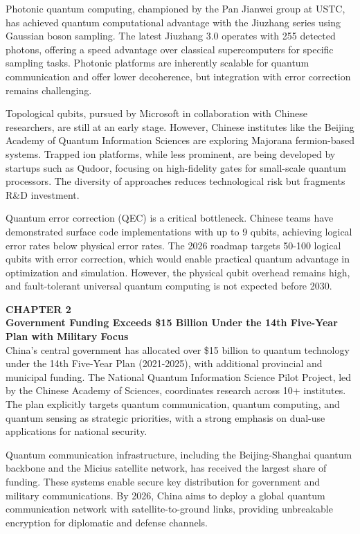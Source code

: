 \documentclass[10pt,a4paper]{article}
\newcommand{\kicker}[1]{\textcolor{BOBlue}{\scriptsize\bfseries\MakeUppercase{#1}}\\[-2pt]}
\newcommand{\Needspace}[1]{\par\vspace{2pt}}
\begin{document}
{\small Photonic quantum computing, championed by the Pan Jianwei group at USTC, has achieved quantum computational advantage with the Jiuzhang series using Gaussian boson sampling. The latest Jiuzhang 3.0 operates with 255 detected photons, offering a speed advantage over classical supercomputers for specific sampling tasks. Photonic platforms are inherently scalable for quantum communication and offer lower decoherence, but integration with error correction remains challenging.}

{\small Topological qubits, pursued by Microsoft in collaboration with Chinese researchers, are still at an early stage. However, Chinese institutes like the Beijing Academy of Quantum Information Sciences are exploring Majorana fermion-based systems. Trapped ion platforms, while less prominent, are being developed by startups such as Qudoor, focusing on high-fidelity gates for small-scale quantum processors. The diversity of approaches reduces technological risk but fragments R\&D investment.}

{\small Quantum error correction (QEC) is a critical bottleneck. Chinese teams have demonstrated surface code implementations with up to 9 qubits, achieving logical error rates below physical error rates. The 2026 roadmap targets 50-100 logical qubits with error correction, which would enable practical quantum advantage in optimization and simulation. However, the physical qubit overhead remains high, and fault-tolerant universal quantum computing is not expected before 2030.}




\Needspace{55mm}
\kicker{Chapter 2}
{\Large\sffamily\bfseries\color{BONavy} Government Funding Exceeds \$15 Billion Under the 14th Five-Year Plan with Military Focus}\\[4pt]

{\small China's central government has allocated over \$15 billion to quantum technology under the 14th Five-Year Plan (2021-2025), with additional provincial and municipal funding. The National Quantum Information Science Pilot Project, led by the Chinese Academy of Sciences, coordinates research across 10+ institutes. The plan explicitly targets quantum communication, quantum computing, and quantum sensing as strategic priorities, with a strong emphasis on dual-use applications for national security.}

{\small Quantum communication infrastructure, including the Beijing-Shanghai quantum backbone and the Micius satellite network, has received the largest share of funding. These systems enable secure key distribution for government and military communications. By 2026, China aims to deploy a global quantum communication network with satellite-to-ground links, providing unbreakable encryption for diplomatic and defense channels.}
\end{document}
